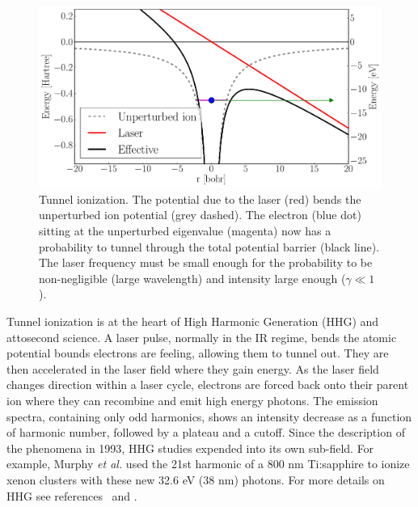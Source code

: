 \begin{figure}
 \centering
 \includegraphics[width=\figurewidth]{figures/ionization_tunnel}
 \caption{\label{fig:ionization:tunnel}Tunnel ionization. The potential
          due to the laser (red) bends the unperturbed ion potential
          (grey dashed). The electron (blue dot) sitting at the unperturbed
          eigenvalue (magenta) now has a probability to tunnel through the total
          potential barrier (black line). The laser frequency must be small
          enough for the probability to be non-negligible (large wavelength)
          and intensity large enough ($\gamma \ll 1$).}
\end{figure}

Tunnel ionization is at the heart of High Harmonic Generation (HHG) and
attosecond science\cite{Fennel2010}. A laser pulse, normally in the IR regime,
bends the atomic potential bounds electrons are feeling, allowing them to tunnel
out. They are then accelerated in the laser field where they gain energy.
As the laser field changes direction within a laser cycle, electrons are forced
back onto their parent ion where they can
recombine and emit high energy photons. The emission spectra,
containing only odd harmonics, shows an intensity decrease as a function of
harmonic number, followed by a plateau and a cutoff. Since the description
of the phenomena in 1993\cite{Corkum1993}, HHG studies expended into its own
sub-field. For example, Murphy \textit{et al.} used the 21st harmonic of a
800 nm Ti:sapphire to ionize xenon clusters\cite{Murphy2008a,Murphy2008b}
with these new 32.6 eV (38 nm) photons.
For more details on HHG see references~\cite{Levesque2006} and
\cite{Lewenstein2008}.


